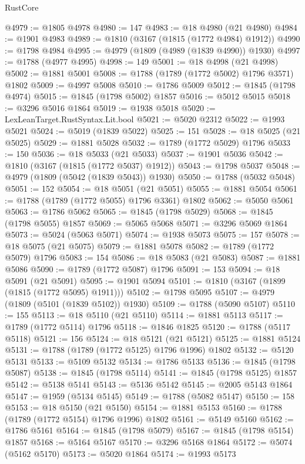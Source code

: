 \begin{lexlean}{RustCore}
\begin{coremodule}
@4979 := @1805 @4978
@4980 := 147
@4983 := @18 @4980 (@21 @4980)
@4984 := @1901 @4983
@4989 := @1810 (@3167 (@1815 (@1772 @4984) @1912))
@4990 := @1798 @4984
@4995 := @4979 (@1809 (@4989 (@1839 @4990)) @1930)
@4997 := @1788 (@4977 @4995)
@4998 := 149
@5001 := @18 @4998 (@21 @4998)
@5002 := @1881 @5001
@5008 := @1788 (@1789 (@1772 @5002) @1796 @3571) @1802
@5009 := @4997 @5008
@5010 := @1786 @5009
@5012 := @1845 (@1798 @4974)
@5015 := @1845 (@1798 @5002) @1857
@5016 := @5012 @5015
@5018 := @3296 @5016 @1864
@5019 := @1938 @5018
@5020 := LexLeanTarget.RustSyntax.Lit.bool
@5021 := @5020 @2312
@5022 := @1993 @5021
@5024 := @5019 (@1839 @5022)
@5025 := 151
@5028 := @18 @5025 (@21 @5025)
@5029 := @1881 @5028
@5032 := @1789 (@1772 @5029) @1796
@5033 := 150
@5036 := @18 @5033 (@21 @5033)
@5037 := @1901 @5036
@5042 := @1810 (@3167 (@1815 (@1772 @5037) @1912))
@5043 := @1798 @5037
@5048 := @4979 (@1809 (@5042 (@1839 @5043)) @1930)
@5050 := @1788 (@5032 @5048)
@5051 := 152
@5054 := @18 @5051 (@21 @5051)
@5055 := @1881 @5054
@5061 := @1788 (@1789 (@1772 @5055) @1796 @3361) @1802
@5062 := @5050 @5061
@5063 := @1786 @5062
@5065 := @1845 (@1798 @5029)
@5068 := @1845 (@1798 @5055) @1857
@5069 := @5065 @5068
@5071 := @3296 @5069 @1864
@5073 := @5024 (@5063 @5071)
@5074 := @1938 @5073
@5075 := 157
@5078 := @18 @5075 (@21 @5075)
@5079 := @1881 @5078
@5082 := @1789 (@1772 @5079) @1796
@5083 := 154
@5086 := @18 @5083 (@21 @5083)
@5087 := @1881 @5086
@5090 := @1789 (@1772 @5087) @1796
@5091 := 153
@5094 := @18 @5091 (@21 @5091)
@5095 := @1901 @5094
@5101 := @1810 (@3167 (@1899 (@1815 (@1772 @5095) @1911)))
@5102 := @1798 @5095
@5107 := @4979 (@1809 (@5101 (@1839 @5102)) @1930)
@5109 := @1788 (@5090 @5107)
@5110 := 155
@5113 := @18 @5110 (@21 @5110)
@5114 := @1881 @5113
@5117 := @1789 (@1772 @5114) @1796
@5118 := @1846 @1825
@5120 := @1788 (@5117 @5118)
@5121 := 156
@5124 := @18 @5121 (@21 @5121)
@5125 := @1881 @5124
@5131 := @1788 (@1789 (@1772 @5125) @1796 @1996) @1802
@5132 := @5120 @5131
@5133 := @5109 @5132
@5134 := @1786 @5133
@5136 := @1845 (@1798 @5087)
@5138 := @1845 (@1798 @5114)
@5141 := @1845 (@1798 @5125) @1857
@5142 := @5138 @5141
@5143 := @5136 @5142
@5145 := @2005 @5143 @1864
@5147 := @1959 (@5134 @5145)
@5149 := @1788 (@5082 @5147)
@5150 := 158
@5153 := @18 @5150 (@21 @5150)
@5154 := @1881 @5153
@5160 := @1788 (@1789 (@1772 @5154) @1796 @1996) @1802
@5161 := @5149 @5160
@5162 := @1786 @5161
@5164 := @1845 (@1798 @5079)
@5167 := @1845 (@1798 @5154) @1857
@5168 := @5164 @5167
@5170 := @3296 @5168 @1864
@5172 := @5074 (@5162 @5170)
@5173 := @5020 @1864
@5174 := @1993 @5173

\end{coremodule}
\end{lexlean}

